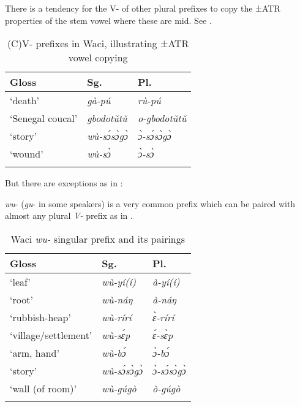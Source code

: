 \documentclass[output=paper]{langsci/langscibook}
\begin{document}
There is a tendency for the V- of other plural prefixes to copy the ±ATR properties of the stem vowel where these are mid. See .

\begin{table}
\caption{(C)V- prefixes in Waci, illustrating ±ATR vowel copying}
\label{extab:nomaffplat:21}
\begin{tabularx}{\textwidth}{XXl}
 \lsptoprule
Gloss 	& {Sg.} 	& {Pl.}\\
\midrule
‘death’ 	&  \itshape gà-pú 	&  \itshape rù-pú\\
‘Senegal coucal’ 	&  \itshape gbodotǔtǔ 	&  \itshape o-gbodotǔtǔ\\
‘story’ 	&  \itshape wù-sɔ́sɔ̀gɔ̀ 	&  \itshape  ɔ̀-sɔ́sɔ̀gɔ̀\\
‘wound’ 	&  \itshape wù-sɔ̀ 	&  \itshape ɔ̀-sɔ̀\\
 \lspbottomrule
\end{tabularx}
\end{table}

 
\newpage  
But there are exceptions as in :


\textit{wu}- (\textit{gu}- in some speakers) is a very common prefix which can be paired with almost any plural \textit{V-} prefix as in .

\begin{table}
\caption{Waci \textit{wu-} singular prefix and its pairings}
\label{extab:nomaffplat:23}
\begin{tabularx}{\textwidth}{XXl}
\lsptoprule 
Gloss 	& {Sg.} 	& {Pl.}\\
\midrule
‘leaf’ 	&  \itshape wù-yí(í) 	&  \itshape à-yí(í)\\
‘root’ 	&  \itshape wù-náŋ 	&  \itshape à-náŋ\\
‘rubbish-heap’ 	&  \itshape wù-rírí 	&  \itshape ɛ̀-rírí\\
‘village/settlement’ 	&  \itshape wù-sɛ́p 	&  \itshape  ɛ́-sɛ̀p\\
‘arm, hand’ 	&  \itshape wù-bɔ́	&  \itshape ɔ̀-bɔ́\\
‘story’ 	&  \itshape wù-sɔ́sɔ̀gɔ̀ 	&  \itshape ɔ̀-sɔ́sɔ̀gɔ̀\\
‘wall (of room)’ 	&  \itshape wù-gúgò 	&  \itshape ò-gúgò\\
 \lspbottomrule
\end{tabularx}
\end{table}
\end{document}
